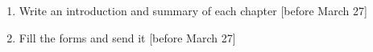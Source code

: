 \begin{enumerate}
\item Write an introduction and summary of each chapter [before March 27]
\item Fill the forms and send it [before March 27]
\end{enumerate}
